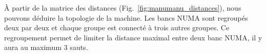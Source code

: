 \`{A} partir de la matrice des distances (Fig.~\ref{fig:manumanu_distances}), nous pouvons déduire la topologie de la machine.
%
Les bancs NUMA sont regroupés deux par deux et chaque groupe est connecté à trois autres groupes.
%
Ce regroupement permet de limiter la distance maximal entre deux banc NUMA, il y aura au maximum 3 sauts.
